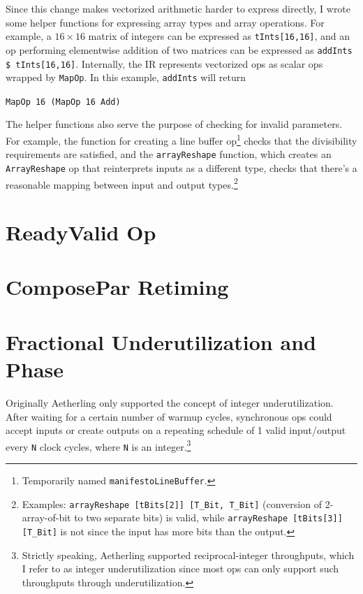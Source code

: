 \documentclass[12pt]{article}
\begin{document}
Since this change makes vectorized arithmetic harder to express
directly, I wrote some helper functions for expressing array types and
array operations. For example, a $16\times 16$ matrix of integers can
be expressed as \texttt{tInts[16,16]}, and an op performing
elementwise addition of two matrices can be expressed as
\texttt{addInts \$ tInts[16,16]}. Internally, the IR represents
vectorized ops as scalar ops wrapped by \texttt{MapOp}.
In this example, \texttt{addInts} will return

\texttt{MapOp 16 (MapOp 16 Add)}

The helper functions also serve the purpose of checking for invalid
parameters. For example, the function for creating a line buffer
op\footnote{Temporarily named \texttt{manifestoLineBuffer}.} checks that the
divisibility requirements are satisfied, and the \texttt{arrayReshape}
function, which creates an \texttt{ArrayReshape} op that reinterprets
inputs as a different type, checks that there's a reasonable mapping
between input and output types.\footnote{
Examples: \texttt{arrayReshape [tBits[2]] [T\_Bit, T\_Bit]} (conversion of
2-array-of-bit to two separate bits) is valid, while
\texttt{arrayReshape [tBits[3]] [T\_Bit]} is not since the input has
more bits than the output.}

\section{ReadyValid Op}

\section{ComposePar Retiming}

\section{Fractional Underutilization and Phase}


Originally Aetherling only supported the concept of integer
underutilization. After waiting for a certain number of warmup cycles,
synchronous ops could accept inputs or create outputs on a repeating
schedule of 1 valid input/output every \texttt{N} clock cycles, where
\texttt{N} is an integer.\footnote{Strictly speaking, Aetherling
  supported reciprocal-integer throughputs, which I refer to as
  integer underutilization since most ops can only support such
  throughputs through underutilization.}
\end{document}
